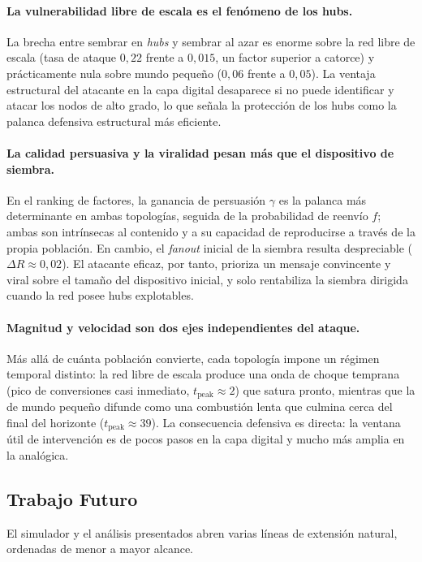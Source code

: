 \documentclass[12pt]{extarticle}
\numberwithin{equation}{section}
\begin{document}
\paragraph{La vulnerabilidad libre de escala es el fenómeno de los hubs.} La brecha entre sembrar en \emph{hubs} y sembrar al azar es enorme sobre la red libre de escala (tasa de ataque $0{,}22$ frente a $0{,}015$, un factor superior a catorce) y prácticamente nula sobre mundo pequeño ($0{,}06$ frente a $0{,}05$). La ventaja estructural del atacante en la capa digital desaparece si no puede identificar y atacar los nodos de alto grado, lo que señala la protección de los hubs como la palanca defensiva estructural más eficiente.

\paragraph{La calidad persuasiva y la viralidad pesan más que el dispositivo de siembra.} En el ranking de factores, la ganancia de persuasión $\gamma$ es la palanca más determinante en ambas topologías, seguida de la probabilidad de reenvío $f$; ambas son intrínsecas al contenido y a su capacidad de reproducirse a través de la propia población. En cambio, el \emph{fanout} inicial de la siembra resulta despreciable ($\Delta R \approx 0{,}02$). El atacante eficaz, por tanto, prioriza un mensaje convincente y viral sobre el tamaño del dispositivo inicial, y solo rentabiliza la siembra dirigida cuando la red posee hubs explotables.

\paragraph{Magnitud y velocidad son dos ejes independientes del ataque.} Más allá de cuánta población convierte, cada topología impone un régimen temporal distinto: la red libre de escala produce una onda de choque temprana (pico de conversiones casi inmediato, $t_{\text{peak}}\approx 2$) que satura pronto, mientras que la de mundo pequeño difunde como una combustión lenta que culmina cerca del final del horizonte ($t_{\text{peak}}\approx 39$). La consecuencia defensiva es directa: la ventana útil de intervención es de pocos pasos en la capa digital y mucho más amplia en la analógica.

\subsection{Trabajo Futuro}

El simulador y el análisis presentados abren varias líneas de extensión natural, ordenadas de menor a mayor alcance.
\end{document}
